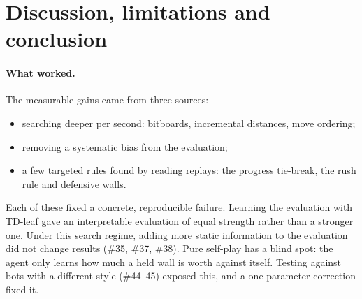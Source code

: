 \section{Discussion, limitations and conclusion}
\label{sec:conclusion}

\paragraph{What worked.}
The measurable gains came from three sources:
\begin{itemize}
  \item searching deeper per second: bitboards, incremental distances, move ordering;
  \item removing a systematic bias from the evaluation;
  \item a few targeted rules found by reading replays: the progress tie-break, the rush rule
        and defensive walls.
\end{itemize}
Each of these fixed a concrete, reproducible failure. Learning the evaluation with TD-leaf gave
an interpretable evaluation of equal strength rather than a stronger one. Under this search
regime, adding more static information to the evaluation did not change results (\#35, \#37,
\#38).
Pure self-play has a blind spot: the agent only learns how much a held wall is worth against
itself. Testing against bots with a different style (\#44--45) exposed this, and a one-parameter
correction fixed it.

